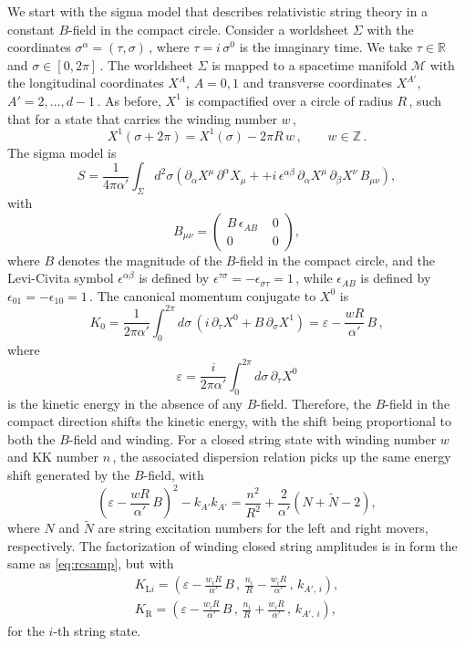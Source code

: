 \documentclass[11pt]{article}
\newcommand{\be}{\begin{equation}}
\newcommand{\ee}{\end{equation}}
\newcommand{\CM}{\mathcal{M}}
\newcommand{\lr}{\left (}
\newcommand{\rr}{\right )}
\newcommand{\p}{\partial}
\renewcommand{\tilde}[1]{\widetilde{#1}}
\begin{document}
We start with the sigma model that describes relativistic string theory in a constant $B$-field in the compact circle.
%
Consider a worldsheet $\Sigma$ with the coordinates $\sigma^\alpha = (\tau, \sigma)$\,, where $\tau = i \, \sigma^0$ is the imaginary time. We take $\tau \in \mathbb{R}$ and $\sigma \in [0, 2\pi]$\,. The worldsheet $\Sigma$ is mapped to a spacetime manifold $\CM$ with the longitudinal coordinates $X^A$, $A = 0,1$ and transverse coordinates $X^{A'}$, $A' = 2, \dots, d-1$\,. As before, $X^1$ is compactified over a circle of radius $R$\,, such that for a state that carries the winding number $w$\,, 
%
\be
    X^1 (\sigma + 2\pi) = X^1(\sigma) - 2 \pi R \, w\,,
        \qquad
    w \in \mathbb{Z}\,.
\ee
%
The sigma model is
%
\be \label{eq:nrsa0}
    S = \frac{1}{4\pi\alpha'} \int_\Sigma d^2 \sigma \left( \p_\alpha X^{\mu} \, \p^\alpha X_{\mu} + + i \, \epsilon^{\alpha\beta} \, \p_\alpha X^\mu \, \p_\beta X^\nu \, B_{\mu\nu} \right),
\ee
%
with
%
\be 
    {B}_{\mu\nu} = 
        \begin{pmatrix}
            B \, \epsilon_{AB} & \,\, 0 \\[2pt]
            0 & \,\, 0
        \end{pmatrix},
\ee
%
where $B$ denotes the magnitude of the $B$-field in the compact circle, and the Levi-Civita symbol $\epsilon^{\alpha\beta}$ is defined by $\epsilon^{\tau\sigma} = - \epsilon_{\sigma\tau} = 1$\,, while $\epsilon_{AB}$ is defined by $\epsilon_{01} = - \epsilon_{10} = 1$\,. The canonical momentum conjugate to $X^0$ is
%
\be
    K_0 = \frac{1}{2\pi \alpha'} \int_0^{2\pi} d\sigma \, \lr i \, \p_\tau X^0 + B \, \p_\sigma X^1 \rr = \varepsilon - \frac{w R}{\alpha'} \, B\,,
\ee
%
where
%
\be
    \varepsilon = \frac{i}{2\pi \alpha'} \int_0^{2\pi} d\sigma \, \p_\tau X^0
\ee
%
is the kinetic energy in the absence of any $B$-field. 
Therefore, the $B$-field in the compact direction shifts the kinetic energy, with the shift being proportional to both the $B$-field and winding. 
For a closed string state with winding number $w$ and KK number $n$\,, the associated dispersion relation picks up the same energy shift generated by the $B$-field, with
%
\be
    \lr \! \varepsilon - \frac{wR}{\alpha'} \, B \! \rr^2 - k_{A'} k_{A'} = \frac{n^2}{R^2} + \frac{2}{\alpha'} \lr N + \tilde{N} - 2 \rr,
\ee
%
where $N$ and $\tilde{N}$ are string excitation numbers for the left and right movers, respectively.
The factorization of winding closed string amplitudes is in form the same as \eqref{eq:rcsamp}, but with
%
\begin{subequations} \label{eq:cskbf}
\begin{align}
    K_{\text{L}i} = \lr \varepsilon - \frac{w_i R}{\alpha'} \, B\,, \, \frac{n_i}{R} - \frac{w_i R}{{\alpha}'}\,, \, k_{A'\!,\, i} \rr, \label{eq:klmB} \\[2pt]
    K_{\text{R}} = \lr \varepsilon - \frac{w_i R}{\alpha'} \, B\,, \, \frac{n_i}{R} + \frac{w_i R}{{\alpha}{}'}\,, \, k_{A'\!,\, i} \rr, \label{eq:krmB}
\end{align}
\end{subequations}
%
for the $i$-th string state.
\end{document}
